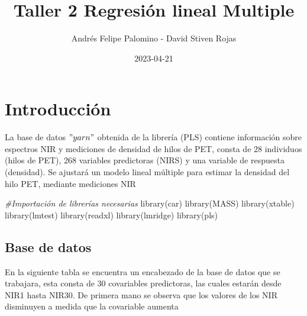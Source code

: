 \documentclass[
]{article}
\title{Taller 2 Regresión lineal Multiple}
\author{Andrés Felipe Palomino - David Stiven Rojas}
\date{2023-04-21}
\newenvironment{Shaded}{\begin{snugshade}}{\end{snugshade}}
\newcommand{\AttributeTok}[1]{\textcolor[rgb]{0.77,0.63,0.00}{#1}}
\newcommand{\CommentTok}[1]{\textcolor[rgb]{0.56,0.35,0.01}{\textit{#1}}}
\newcommand{\DecValTok}[1]{\textcolor[rgb]{0.00,0.00,0.81}{#1}}
\newcommand{\FunctionTok}[1]{\textcolor[rgb]{0.00,0.00,0.00}{#1}}
\newcommand{\NormalTok}[1]{#1}
\newcommand{\OtherTok}[1]{\textcolor[rgb]{0.56,0.35,0.01}{#1}}
\newcommand{\SpecialCharTok}[1]{\textcolor[rgb]{0.00,0.00,0.00}{#1}}
\newcommand{\StringTok}[1]{\textcolor[rgb]{0.31,0.60,0.02}{#1}}
\begin{document}
\maketitle

\hypertarget{introducciuxf3n}{%
\section{Introducción}\label{introducciuxf3n}}

La base de datos \("yarn"\) obtenida de la librería (PLS) contiene
información sobre espectros NIR y mediciones de densidad de hilos de
PET, consta de 28 individuos (hilos de PET), 268 variables predictoras
(NIRS) y una variable de respuesta (densidad). Se ajustará un modelo
lineal múltiple para estimar la densidad del hilo PET, mediante
mediciones NIR

\begin{Shaded}
\begin{Highlighting}[]
\CommentTok{\#Importación de librerías necesarias}
\FunctionTok{library}\NormalTok{(car)}
\FunctionTok{library}\NormalTok{(MASS)}
\FunctionTok{library}\NormalTok{(xtable)}
\FunctionTok{library}\NormalTok{(lmtest)}
\FunctionTok{library}\NormalTok{(readxl)}
\FunctionTok{library}\NormalTok{(lmridge)}
\FunctionTok{library}\NormalTok{(pls)}
\end{Highlighting}
\end{Shaded}

\hypertarget{base-de-datos}{%
\subsection{Base de datos}\label{base-de-datos}}

En la siguiente tabla se encuentra un encabezado de la base de datos que
se trabajara, esta consta de 30 covariables predictoras, las cuales
estarán desde NIR1 hasta NIR30. De primera mano se observa que los
valores de los NIR disminuyen a medida que la covariable aumenta

\begin{Shaded}
\end{Shaded}
\end{document}
